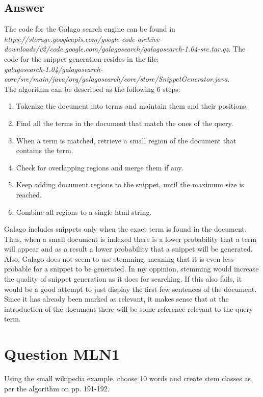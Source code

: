 \documentclass{article}
\begin{document}
	\subsection*{Answer}
	The code for the Galago search engine can be found in \textit{https://storage.googleapis.com/google-code-archive-downloads/v2/code.google.com/galagosearch/galagosearch-1.04-src.tar.gz}. The code for the snippet generation resides in the file: \\ \textit{galagosearch-1.04/galagosearch-core/src/main/java/org/galagosearch/core/store/SnippetGenerator.java}.\\
	The algorithm can be described as the following 6 steps:
	\begin{enumerate}
		\item Tokenize the document into terms and maintain them and their positions.
		\item Find all the terms in the document that match the ones of the query.
		\item When a term is matched, retrieve a small region of the document that contains the term.
		\item Check for overlapping regions and merge them if any.
		\item Keep adding document regions to the snippet, until the maximum size is reached.
		\item Combine all regions to a single html string.
	\end{enumerate}
	Galago includes snippets only when the exact term is found in the document. Thus, when a small document is indexed there is a lower probability that a term will appear and as a result a lower probability that a snippet will be generated. Also, Galago does not seem to use stemming, meaning that it is even less probable for a snippet to be generated. In my oppinion, stemming would increase the quality of snippet generation as it does for searching. If this also fails, it would be a good attempt to just display the first few sentences of the document. Since it has already been marked as relevant, it makes sense that at the introduction of the document there will be some reference relevant to the query term.
	\section*{Question MLN1}
	Using the small wikipedia example, choose 10 words and create stem classes as per the algorithm on pp. 191-192.
\end{document}
